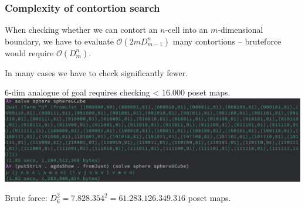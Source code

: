 \documentclass[xetex, mathserif, serif]{beamer}
\newcommand{\pint}[1]{\mathbf{I}^{#1}}
\begin{document}





\begin{frame}
  \frametitle{Complexity of contortion search}

  When checking whether we can contort an $n$-cell into an $m$-dimensional
  boundary, we have to evaluate $\mathcal{O}(2mD_{m-1}^n)$ many contortions --
  bruteforce would require $\mathcal{O}(D_{m}^n)$.

  \vspace{1em} In many cases we have to check significantly fewer.

  \pause

  \begin{exampleblock}{}
  6-dim analogue of goal requires checking < 16.000 poset maps.
  \includegraphics[width=\textwidth]{img/6cube}

  Brute force: $D_6^2 = 7.828.354^2 = 61.283.126.349.316$ poset maps.

  \end{exampleblock}
\end{frame}
\end{document}
